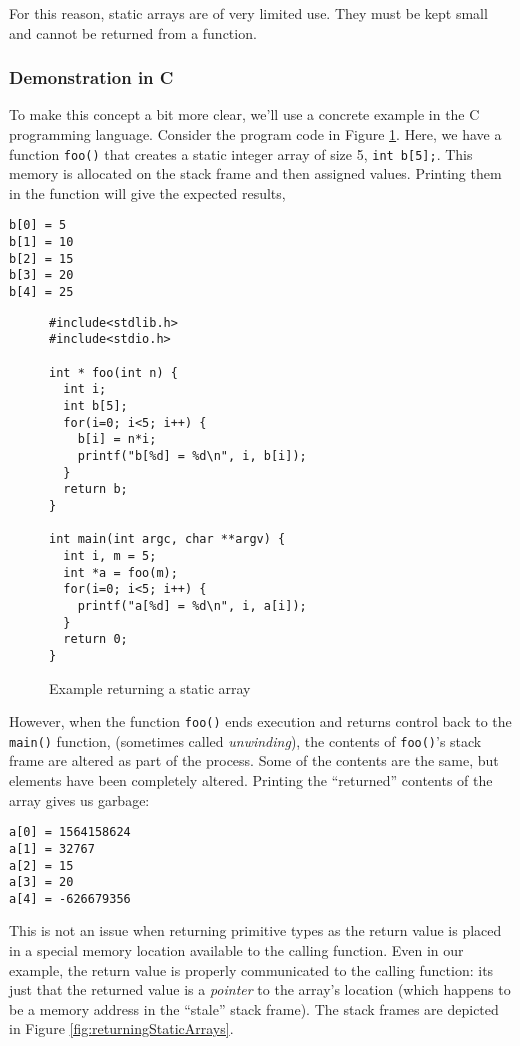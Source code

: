 For this reason, static arrays are of very limited use.  They
must be kept small and cannot be returned from a function.

\subsubsection{Demonstration in C}

To make this concept a bit more clear, we'll use a concrete
example in the C programming language.  Consider the 
program code in Figure \ref{code:returnStaticArray}.  Here,
we have a function \texttt{foo()} that creates a
static integer array of size 5, \texttt{int b[5];}.  This
memory is allocated on the stack frame and then assigned
values.  Printing them in the function will give the expected
results, 

\begin{verbatim}
b[0] = 5
b[1] = 10
b[2] = 15
b[3] = 20
b[4] = 25
\end{verbatim}

\begin{figure}[H]
\centering
\begin{verbatim}
#include<stdlib.h>
#include<stdio.h>

int * foo(int n) {
  int i;
  int b[5];
  for(i=0; i<5; i++) {
    b[i] = n*i;
    printf("b[%d] = %d\n", i, b[i]);
  }
  return b;
}

int main(int argc, char **argv) {
  int i, m = 5;
  int *a = foo(m);
  for(i=0; i<5; i++) {
    printf("a[%d] = %d\n", i, a[i]);
  }
  return 0;
}
\end{verbatim}
\caption{Example returning a static array}
\label{code:returnStaticArray}
\end{figure}

However, when the function \texttt{foo()} ends execution and 
returns control back to the \texttt{main()} function, (sometimes 
called \emph{unwinding}), the contents of \texttt{foo()}'s stack
frame are altered as part of the process.  Some of the contents are the
same, but elements have been completely altered.  Printing the ``returned'' 
contents of the array gives us garbage:  

\begin{verbatim}
a[0] = 1564158624
a[1] = 32767
a[2] = 15
a[3] = 20
a[4] = -626679356
\end{verbatim}

This is not an issue when returning primitive types as 
the return value is placed in a special memory location 
available to the calling function.  Even in our example, the
return value is properly communicated to the calling function:
its just that the returned value is a \emph{pointer} to the array's
location (which happens to be a memory address in the 
``stale'' stack frame).  The stack frames are depicted in Figure 
\ref{fig:returningStaticArrays}.

